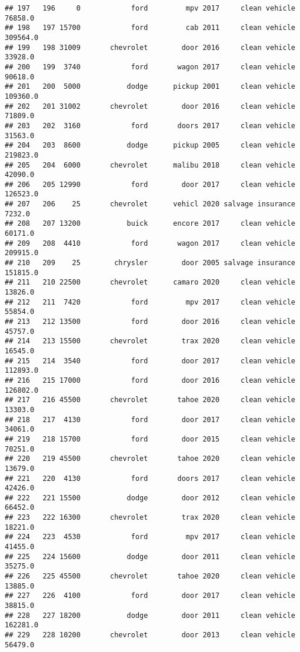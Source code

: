 \documentclass[
]{article}
\begin{document}
\begin{verbatim}
## 197   196     0            ford         mpv 2017     clean vehicle   76858.0
## 198   197 15700            ford         cab 2011     clean vehicle  309564.0
## 199   198 31009       chevrolet        door 2016     clean vehicle   33928.0
## 200   199  3740            ford       wagon 2017     clean vehicle   90618.0
## 201   200  5000           dodge      pickup 2001     clean vehicle  109360.0
## 202   201 31002       chevrolet        door 2016     clean vehicle   71809.0
## 203   202  3160            ford       doors 2017     clean vehicle   31563.0
## 204   203  8600           dodge      pickup 2005     clean vehicle  219823.0
## 205   204  6000       chevrolet      malibu 2018     clean vehicle   42090.0
## 206   205 12990            ford        door 2017     clean vehicle  126523.0
## 207   206    25       chevrolet      vehicl 2020 salvage insurance    7232.0
## 208   207 13200           buick      encore 2017     clean vehicle   60171.0
## 209   208  4410            ford       wagon 2017     clean vehicle  209915.0
## 210   209    25        chrysler        door 2005 salvage insurance  151815.0
## 211   210 22500       chevrolet      camaro 2020     clean vehicle   13826.0
## 212   211  7420            ford         mpv 2017     clean vehicle   55854.0
## 213   212 13500            ford        door 2016     clean vehicle   45757.0
## 214   213 15500       chevrolet        trax 2020     clean vehicle   16545.0
## 215   214  3540            ford        door 2017     clean vehicle  112893.0
## 216   215 17000            ford        door 2016     clean vehicle  126802.0
## 217   216 45500       chevrolet       tahoe 2020     clean vehicle   13303.0
## 218   217  4130            ford        door 2017     clean vehicle   34061.0
## 219   218 15700            ford        door 2015     clean vehicle   70251.0
## 220   219 45500       chevrolet       tahoe 2020     clean vehicle   13679.0
## 221   220  4130            ford       doors 2017     clean vehicle   42426.0
## 222   221 15500           dodge        door 2012     clean vehicle   66452.0
## 223   222 16300       chevrolet        trax 2020     clean vehicle   18221.0
## 224   223  4530            ford         mpv 2017     clean vehicle   41455.0
## 225   224 15600           dodge        door 2011     clean vehicle   35275.0
## 226   225 45500       chevrolet       tahoe 2020     clean vehicle   13885.0
## 227   226  4100            ford        door 2017     clean vehicle   38815.0
## 228   227 18200           dodge        door 2011     clean vehicle  162281.0
## 229   228 10200       chevrolet        door 2013     clean vehicle   56479.0

\end{verbatim}
\end{document}
